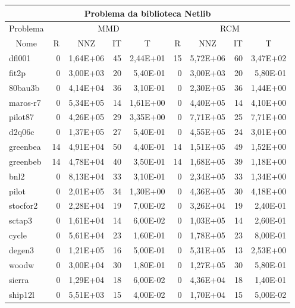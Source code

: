 \begin{tabular}{|l|r|r|r|r|r|r|r|r|}
\hline
\multicolumn{9}{|c|}{Problema da biblioteca Netlib} \\ \hline
\multicolumn{1}{|c|}{Problema} & \multicolumn{4}{|c|}{MMD} &         \multicolumn{4}{|c|}{RCM} \\ \hline
\multicolumn{1}{|c|}{Nome} & \multicolumn{1}{|c|}{R} &
        \multicolumn{1}{|c|}{NNZ} & \multicolumn{1}{|c|}{IT} &
        \multicolumn{1}{|c|}{T} & \multicolumn{1}{|c|}{R} &
        \multicolumn{1}{|c|}{NNZ} & \multicolumn{1}{|c|}{IT} &
        \multicolumn{1}{|c|}{T} \\ \hline
dfl001 & 0 & 1,64E+06 & 45 & 2,44E+01 & 15 & 5,72E+06 & 60 & 3,47E+02 \\ \hline
fit2p & 0 & 3,00E+03 & 20 & 5,40E-01 & 0 & 3,00E+03 & 20 & 5,80E-01 \\ \hline
80bau3b & 0 & 4,14E+04 & 36 & 3,10E-01 & 0 & 2,30E+05 & 36 & 1,44E+00 \\ \hline
maros-r7 & 0 & 5,34E+05 & 14 & 1,61E+00 & 0 & 4,40E+05 & 14 & 4,10E+00 \\ \hline
pilot87 & 0 & 4,26E+05 & 29 & 3,35E+00 & 0 & 7,71E+05 & 25 & 7,71E+00 \\ \hline
d2q06c & 0 & 1,37E+05 & 27 & 5,40E-01 & 0 & 4,55E+05 & 24 & 3,01E+00 \\ \hline
greenbea & 14 & 4,91E+04 & 50 & 4,40E-01 & 14 & 1,51E+05 & 49 & 1,52E+00 \\ \hline
greenbeb & 14 & 4,78E+04 & 40 & 3,50E-01 & 14 & 1,68E+05 & 39 & 1,18E+00 \\ \hline
bnl2 & 0 & 8,13E+04 & 33 & 3,10E-01 & 0 & 2,34E+05 & 33 & 1,34E+00 \\ \hline
pilot & 0 & 2,01E+05 & 34 & 1,30E+00 & 0 & 4,36E+05 & 30 & 4,18E+00 \\ \hline
stocfor2 & 0 & 2,28E+04 & 19 & 7,00E-02 & 0 & 3,26E+04 & 19 & 2,40E-01 \\ \hline
sctap3 & 0 & 1,61E+04 & 14 & 6,00E-02 & 0 & 1,03E+05 & 14 & 2,60E-01 \\ \hline
cycle & 0 & 5,61E+04 & 23 & 1,60E-01 & 0 & 1,78E+05 & 23 & 8,00E-01 \\ \hline
degen3 & 0 & 1,21E+05 & 16 & 5,00E-01 & 0 & 5,31E+05 & 13 & 2,53E+00 \\ \hline
woodw & 0 & 3,00E+04 & 30 & 1,80E-01 & 0 & 1,27E+05 & 30 & 5,80E-01 \\ \hline
sierra & 0 & 1,29E+04 & 18 & 6,00E-02 & 0 & 4,36E+04 & 18 & 1,40E-01 \\ \hline
ship12l & 0 & 5,51E+03 & 15 & 4,00E-02 & 0 & 1,70E+04 & 15 & 5,00E-02 \\ \hline

\end{tabular}
